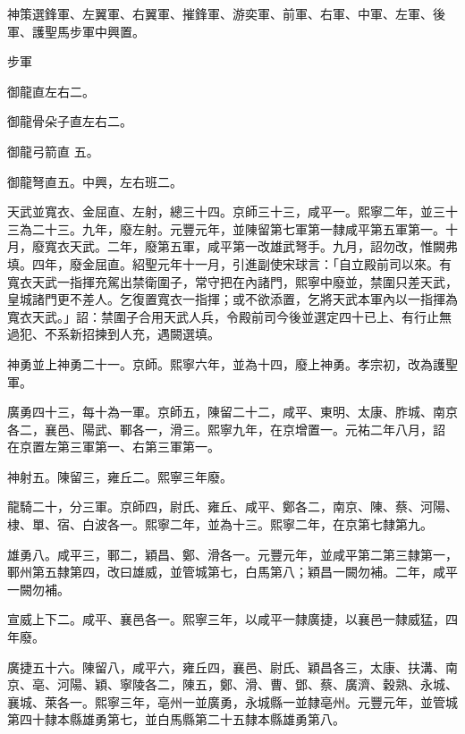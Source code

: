 \begin{pinyinscope}
 神策選鋒軍、左翼軍、右翼軍、摧鋒軍、游奕軍、前軍、右軍、中軍、左軍、後軍、護聖馬步軍中興置。



 步軍



 御龍直左右二。



 御龍骨朵子直左右二。



 御龍弓箭直
 五。



 御龍弩直五。中興，左右班二。



 天武並寬衣、金屈直、左射，總三十四。京師三十三，咸平一。熙寧二年，並三十三為二十三。九年，廢左射。元豐元年，並陳留第七軍第一隸咸平第五軍第一。十月，廢寬衣天武。二年，廢第五軍，咸平第一改雄武弩手。九月，詔勿改，惟闕弗填。四年，廢金屈直。紹聖元年十一月，引進副使宋球言：「自立殿前司以來。有寬衣天武一指揮充駕出禁衛圍子，常守把在內諸門，熙寧中廢並，禁圍只差天武，皇城諸門更不差人。乞復置寬衣一指揮；或不欲添置，乞將天武本軍內以一指揮為寬衣天武。」詔：禁圍子合用天武人兵，令殿前司今後並選定四十已上、有行止無過犯、不系新招揀到人充，遇闕選填。



 神勇並上神勇二十一。京師。熙寧六年，並為十四，廢上神勇。孝宗初，改為護聖軍。



 廣勇四十三，每十為一軍。京師五，陳留二十二，咸平、東明、太康、胙城、南京各二，襄邑、陽武、鄆各一，滑三。熙寧九年，在京增置一。元祐二年八月，詔
 在京置左第三軍第一、右第三軍第一。



 神射五。陳留三，雍丘二。熙寧三年廢。



 龍騎二十，分三軍。京師四，尉氏、雍丘、咸平、鄭各二，南京、陳、蔡、河陽、棣、單、宿、白波各一。熙寧二年，並為十三。熙寧二年，在京第七隸第九。



 雄勇八。咸平三，鄆二，穎昌、鄭、滑各一。元豐元年，並咸平第二第三隸第一，鄆州第五隸第四，改曰雄威，並管城第七，白馬第八；穎昌一闕勿補。二年，咸平一闕勿補。



 宣威上下二。咸平、襄邑各一。熙寧三年，以咸平一隸廣捷，以襄邑一隸威猛，四年廢。



 廣捷五十六。陳留八，咸平六，雍丘四，襄邑、尉氏、穎昌各三，太康、扶溝、南京、亳、河陽、穎、寧陵各二，陳五，鄭、滑、曹、鄧、蔡、廣濟、穀熟、永城、襄城、萊各一。熙寧三年，亳州一並廣勇，永城縣一並隸亳州。元豐元年，並管城第四十隸本縣雄勇第七，並白馬縣第二十五隸本縣雄勇第八。




\end{pinyinscope}
